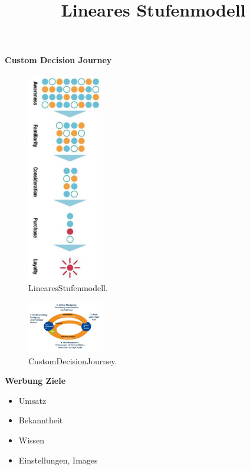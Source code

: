 \documentclass[../ZF_Wing.tex]{subfiles}
\begin{document}
\paragraph{Custom Decision Journey}
\begin{multicols}{2}

\title{Lineares Stufenmodell}

\begin{figure}[H]
\centering
\includegraphics[width=0.3\textwidth]{Resources/Image/LinearesStufenmodell.png}
\caption{\label{fig:LinearesStufenmodell}LinearesStufenmodell.}
\end{figure}

\columnbreak

\begin{figure}[H]
\centering
\includegraphics[width=0.3\textwidth]{Resources/Image/CustomDecisionJourney.png}
\caption{\label{fig:CustomDecisionJourney}CustomDecisionJourney.}
\end{figure}

\end{multicols}


\textbf{Werbung Ziele\\}

\begin{itemize}
	\item Umsatz
	\item Bekanntheit
	\item Wissen
	\item Einstellungen, Images
\end{itemize}
\end{document}
